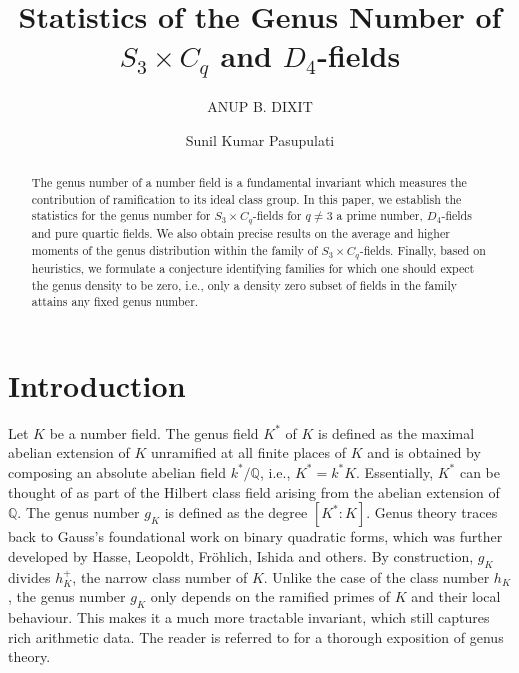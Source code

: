 \documentclass[11pt,reqno]{amsart}
\title[Statistics of the Genus Number of  $S_3 \times C_q$ and $D_4$-fields]
{Statistics of the Genus Number of  $S_3 \times C_q$ and $D_4$-fields}
\author{ANUP B. DIXIT}
\author{Sunil Kumar Pasupulati}
\newcommand{\Q}{\mathbb{Q}}
\theoremstyle{definition}
\theoremstyle{remark}
\begin{document}
\begin{abstract}
    The genus number of a number field is a fundamental invariant which measures the contribution of ramification to its ideal class group. In this paper, we establish the statistics for the genus number for $S_3\times C_q$-fields for $q\neq 3$ a prime number, $D_4$-fields and pure quartic fields. We also obtain precise results on the average and higher moments of the genus distribution within the family of $S_3\times C_q$-fields. Finally, based on heuristics, we formulate a conjecture identifying families for which one should expect the genus density to be zero, i.e., only a density zero subset of fields in the family attains any fixed genus number.
\end{abstract}
    	\maketitle

\section{\bf Introduction}
\medskip

Let $K$ be a number field. The genus field $K^*$ of $K$ is defined as the maximal abelian extension of $K$ unramified at all finite places of $K$ and is obtained by composing an absolute abelian field $k^*/\Q$, i.e., $K^* = k^* K$. Essentially, $K^*$ can be thought of as part of the Hilbert class field arising from the abelian extension of $\Q$. The genus number $g_K$ is defined as the degree $[K^*:K]$. Genus theory traces back to Gauss’s foundational work on binary quadratic forms, which was further developed by Hasse, Leopoldt, Fr\"{o}hlich, Ishida and others. By construction, $g_K$ divides $h_K^+$, the narrow class number of $K$. Unlike the case of the class number $h_K$, the genus number $g_K$ only depends on the ramified primes of $K$ and their local behaviour. This makes it a much more tractable invariant, which still captures rich arithmetic data. The reader is referred to \cite{Ishidabook} for a thorough exposition of genus theory.\\
\end{document}
